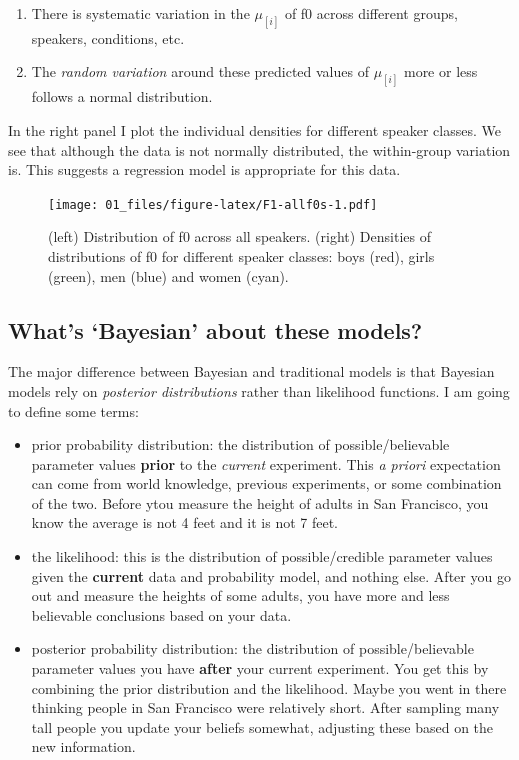 \documentclass[
]{book}
\begin{document}
\begin{enumerate}
\def\labelenumi{\arabic{enumi})}
\item
  There is systematic variation in the \(\mu_{[i]}\) of f0 across different groups, speakers, conditions, etc.
\item
  The \emph{random variation} around these predicted values of \(\mu_{[i]}\) more or less follows a normal distribution.
\end{enumerate}

In the right panel I plot the individual densities for different speaker classes. We see that although the data is not normally distributed, the within-group variation is. This suggests a regression model is appropriate for this data.

\begin{figure}
\centering
\texttt{[image: 01\_files/figure-latex/F1-allf0s-1.pdf]}
\caption{\label{fig:F1-allf0s}(left) Distribution of f0 across all speakers. (right) Densities of distributions of f0 for different speaker classes: boys (red), girls (green), men (blue) and women (cyan).}
\end{figure}

\hypertarget{whats-bayesian-about-these-models}{%
\subsection{What's `Bayesian' about these models?}\label{whats-bayesian-about-these-models}}

The major difference between Bayesian and traditional models is that Bayesian models rely on \emph{posterior distributions} rather than likelihood functions. I am going to define some terms:

\begin{itemize}
\item
  prior probability distribution: the distribution of possible/believable parameter values \textbf{prior} to the \emph{current} experiment. This \emph{a priori} expectation can come from world knowledge, previous experiments, or some combination of the two. Before ytou measure the height of adults in San Francisco, you know the average is not 4 feet and it is not 7 feet.
\item
  the likelihood: this is the distribution of possible/credible parameter values given the \textbf{current} data and probability model, and nothing else. After you go out and measure the heights of some adults, you have more and less believable conclusions based on your data.
\item
  posterior probability distribution: the distribution of possible/believable parameter values you have \textbf{after} your current experiment. You get this by combining the prior distribution and the likelihood. Maybe you went in there thinking people in San Francisco were relatively short. After sampling many tall people you update your beliefs somewhat, adjusting these based on the new information.
\end{itemize}
\end{document}
